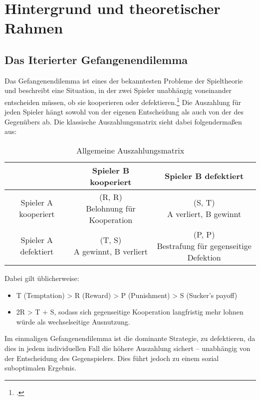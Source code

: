 \chapter{Hintergrund und theoretischer Rahmen}
\section{Das Iterierter Gefangenendilemma}
Das Gefangenendilemma ist eines der bekanntesten Probleme der Spieltheorie und 
beschreibt eine Situation, in der zwei Spieler unabhängig voneinander entscheiden 
müssen, ob sie kooperieren oder defektieren.\footcite{fudenberg1991gametheory} Die Auszahlung für jeden Spieler hängt 
sowohl von der eigenen Entscheidung als auch von der des Gegenübers ab. 
Die klassische Auszahlungsmatrix sieht dabei folgendermaßen aus:

\begin{table}[h!]
    \centering
    \begin{tabular}{c|c|c}
            & Spieler B kooperiert & Spieler B defektiert\\
        \hline
        Spieler A kooperiert &  \makecell{(R, R) \\ Belohnung für Kooperation} & \makecell{(S, T) \\ A verliert, B gewinnt} \\
        \hline
        Spieler A defektiert &  \makecell{(T, S) \\ A gewinnt, B verliert} & \makecell{(P, P) \\ Bestrafung für gegenseitige Defektion} \\
    \end{tabular}
    \caption{Allgemeine Auszahlungsmatrix}
    \label{table:allgemeineauszahlungsmatrix}
\end{table}

Dabei gilt üblicherweise:
\begin{itemize}
    \item T (Temptation) > R (Reward) > P (Punishment) > S (Sucker's payoff)
    \item 2R > T + S, sodass sich gegenseitige Kooperation langfristig mehr lohnen würde als wechselseitige Ausnutzung.
\end{itemize}
Im einmaligen Gefangenendilemma ist die dominante Strategie, zu defektieren, da 
dies in jedem individuellen Fall die höhere Auszahlung sichert -- unabhängig von der 
Entscheidung des Gegenspielers. Dies führt jedoch zu einem sozial suboptimalen 
Ergebnis.

